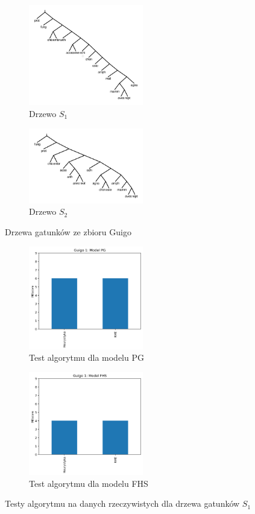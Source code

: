 \documentclass[licencjacka]{pracamgr}
\begin{document}
\begin{figure}[H]
\centering
\begin{subfigure}{.5\textwidth}
  \centering
  \includegraphics[width=50mm]{./pictures/guigo_spec_1.png}
  \caption{Drzewo $S_1$}
  \label{fig:sub2}
\end{subfigure}%
\begin{subfigure}{.5\textwidth}
  \centering
  \includegraphics[width=50mm]{./pictures/guigo_spec_2.png}
  \caption{Drzewo $S_2$}
  \label{fig:sub1}
\end{subfigure}%
\caption{Drzewa gatunków ze zbioru Guigo}
\label{fig:test}
\end{figure}

\begin{figure}[H]
\centering
\begin{subfigure}{.5\textwidth}
  \centering
  \includegraphics[width=50mm]{./pictures/G1_PG.png}
  \caption{Test algorytmu dla modelu PG}
  \label{fig:sub2}
\end{subfigure}%
\begin{subfigure}{.5\textwidth}
  \centering
  \includegraphics[width=50mm]{./pictures/G1_FHS.png}
  \caption{Test algorytmu dla modelu FHS}
  \label{fig:sub1}
\end{subfigure}%
\caption{Testy algorytmu na danych rzeczywistych dla drzewa gatunków $S_1$}
\label{fig:test}
\end{figure}
\end{document}
